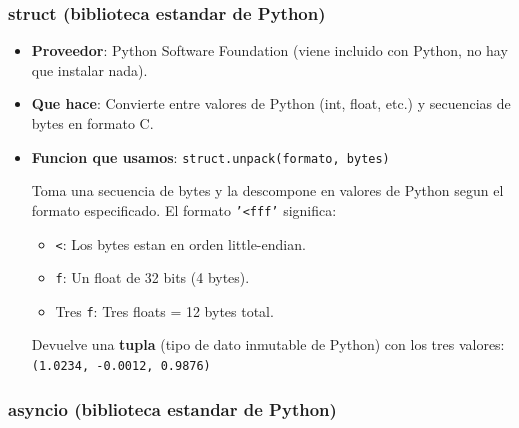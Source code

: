 \documentclass[11pt,a4paper]{article}
\begin{document}
\subsubsection{struct (biblioteca estandar de Python)}

\begin{itemize}
    \item \textbf{Proveedor}: Python Software Foundation (viene
          incluido con Python, no hay que instalar nada).
    \item \textbf{Que hace}: Convierte entre valores de Python (int,
          float, etc.) y secuencias de bytes en formato C.
    \item \textbf{Funcion que usamos}: \texttt{struct.unpack(formato,
          bytes)}

          Toma una secuencia de bytes y la descompone en valores de
          Python segun el formato especificado. El formato
          \texttt{'<fff'} significa:
    \begin{itemize}
        \item \texttt{<}: Los bytes estan en orden little-endian.
        \item \texttt{f}: Un float de 32 bits (4 bytes).
        \item Tres \texttt{f}: Tres floats = 12 bytes total.
    \end{itemize}

          Devuelve una \textbf{tupla} (tipo de dato inmutable de
          Python) con los tres valores:
          \texttt{(1.0234, -0.0012, 0.9876)}
\end{itemize}

\subsubsection{asyncio (biblioteca estandar de Python)}
\end{document}
